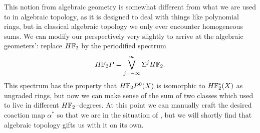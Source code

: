 This notion from algebraic geometry is somewhat different from what we are used to in algebraic topology, as it is designed to deal with things like polynomial rings, but in classical algebraic topology we only ever encounter homogeneous sums.  We can modify our perspectively very slightly to arrive at the algebraic geometers': replace $H\mathbb F_2$ by the periodified spectrum \[H\mathbb F_2P = \bigvee_{j=-\infty}^\infty \Sigma^j H\mathbb F_2.\]  This spectrum has the property that $H\mathbb F_2P^0(X)$ is isomorphic to $H\mathbb F_2^*(X)$ as ungraded rings, but now we can make sense of the sum of two classes which used to live in different $H\mathbb F_2$--degrees.  At this point we can manually craft the desired coaction map $\alpha^*$ so that we are in the situation of , but we will shortly find that algebraic topology gifts us with it on its own.

